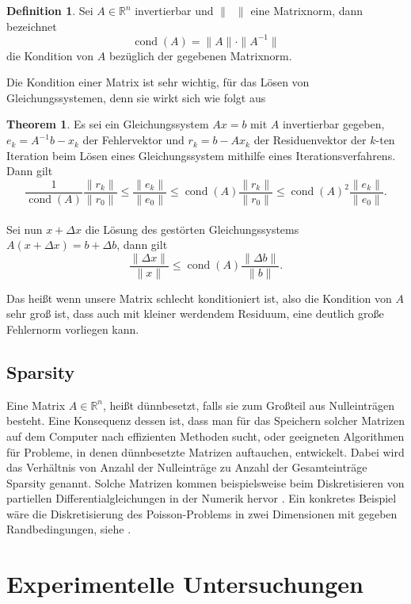 \documentclass{scrartcl}
\newcommand\R{\mathbb{R}}
\theoremstyle{definition}
\newtheorem{definition}{Definition}
\newtheorem{theorem}{Theorem}
\begin{document}
\begin{definition}\cite[p.~25]{Iterative}
    Sei \(A \in \R^n\) invertierbar und \(\| \phantom{x}\|\) eine Matrixnorm, dann bezeichnet
    \[\operatorname{cond}(A)=\|A\| \cdot\|A^{-1}\|\]
    die Kondition von \(A\) bezüglich der gegebenen Matrixnorm.
\end{definition}
Die Kondition einer Matrix ist sehr wichtig, für das Lösen von Gleichungssystemen, denn sie wirkt sich wie folgt aus
\begin{theorem}\cite[p.~26-27]{Iterative}
    Es sei ein Gleichungssystem \(Ax=b\) mit \(A\) invertierbar gegeben, \(e_k = A^{-1}b-x_k\) der Fehlervektor und \(r_k = b - Ax_k\) der Residuenvektor der \(k\)-ten Iteration beim Lösen eines Gleichungssystem mithilfe eines Iterationsverfahrens.
    Dann gilt
    \[\frac{1}{\operatorname{cond}(A)} \frac{\|r_k\|}{\|r_0\|} \leq \frac{\|e_k\|}{\|e_0\|} \leq \operatorname{cond}(A) \frac{\|r_k\|}{\|r_0\|} \leq \operatorname{cond}(A)^2 \frac{\|e_k\|}{\|e_0\|}.\]
    \\
    Sei nun \(x+\Delta x\) die Lösung des gestörten Gleichungssystems \(A(x + \Delta x)= b+ \Delta b\), dann gilt
    \[\frac{\|\Delta x\|}{\|x\|} \leq \operatorname{cond}(A) \frac{\|\Delta b\|}{\|b\|}.\]
\end{theorem}
Das heißt wenn unsere Matrix schlecht konditioniert ist, also die Kondition von \(A\) sehr groß ist, dass auch mit kleiner werdendem Residuum, eine deutlich große Fehlernorm vorliegen kann.

\subsection{Sparsity}
Eine Matrix \(A \in \R^n \), heißt dünnbesetzt, falls sie zum Großteil aus Nulleinträgen besteht.
Eine Konsequenz dessen ist, dass man für das Speichern solcher Matrizen auf dem Computer nach effizienten Methoden sucht, oder geeigneten Algorithmen für Probleme, in denen dünnbesetzte Matrizen auftauchen, entwickelt. Dabei wird das Verhältnis von Anzahl der Nulleinträge zu Anzahl der Gesamteinträge Sparsity genannt. Solche Matrizen kommen beispielsweise beim Diskretisieren von partiellen Differentialgleichungen in der Numerik hervor \cite{dewiki:233309191}.
Ein konkretes Beispiel wäre die Diskretisierung des Poisson-Problems in zwei Dimensionen mit gegeben Randbedingungen, siehe \cite{HandoutLU}.





\section{Experimentelle Untersuchungen}
\end{document}
